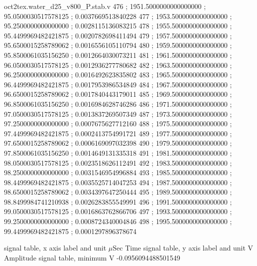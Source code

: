 \begin{filecontents}[overwrite]{oct2tex.water_d25_v800_P.stab.v}
476 ; 1951.5000000000000000 ; 95.0500030517578125 ; 0.0037669513840228
477 ; 1953.5000000000000000 ; 95.2500000000000000 ; 0.0028115136083215
478 ; 1955.5000000000000000 ; 95.4499969482421875 ; 0.0020782698411494
479 ; 1957.5000000000000000 ; 95.6500015258789062 ; 0.0016556105110794
480 ; 1959.5000000000000000 ; 95.8500061035156250 ; 0.0012664030073211
481 ; 1961.5000000000000000 ; 96.0500030517578125 ; 0.0012936277780682
482 ; 1963.5000000000000000 ; 96.2500000000000000 ; 0.0016492623835802
483 ; 1965.5000000000000000 ; 96.4499969482421875 ; 0.0017953986534849
484 ; 1967.5000000000000000 ; 96.6500015258789062 ; 0.0017840443179011
485 ; 1969.5000000000000000 ; 96.8500061035156250 ; 0.0016984628746286
486 ; 1971.5000000000000000 ; 97.0500030517578125 ; 0.0013837269507349
487 ; 1973.5000000000000000 ; 97.2500000000000000 ; 0.0007675627712160
488 ; 1975.5000000000000000 ; 97.4499969482421875 ; 0.0002413754991721
489 ; 1977.5000000000000000 ; 97.6500015258789062 ; 0.0006169097032398
490 ; 1979.5000000000000000 ; 97.8500061035156250 ; 0.0014649131335318
491 ; 1981.5000000000000000 ; 98.0500030517578125 ; 0.0023518626112491
492 ; 1983.5000000000000000 ; 98.2500000000000000 ; 0.0031546954996884
493 ; 1985.5000000000000000 ; 98.4499969482421875 ; 0.0035525714047253
494 ; 1987.5000000000000000 ; 98.6500015258789062 ; 0.0034397647250444
495 ; 1989.5000000000000000 ; 98.8499984741210938 ; 0.0026283855549991
496 ; 1991.5000000000000000 ; 99.0500030517578125 ; 0.0016863762866706
497 ; 1993.5000000000000000 ; 99.2500000000000000 ; 0.0008724340004846
498 ; 1995.5000000000000000 ; 99.4499969482421875 ; 0.0001297896378674
\end{filecontents}
\expandafter\def\csname oct2tex.water_d25_v800_P.stabxlbl.d\endcsname{signal table, x axis label and unit}
\expandafter\def\csname oct2tex.water_d25_v800_P.stabxlbl.u\endcsname{\ensuremath{\mu\text{Sec}}}
\expandafter\def\csname oct2tex.water_d25_v800_P.stabxlbl.v\endcsname{Time}
\expandafter\def\csname oct2tex.water_d25_v800_P.stabylbl.d\endcsname{signal table, y axis label and unit}
\expandafter\def\csname oct2tex.water_d25_v800_P.stabylbl.u\endcsname{\ensuremath{\text{V}}}
\expandafter\def\csname oct2tex.water_d25_v800_P.stabylbl.v\endcsname{Amplitude}
\expandafter\def\csname oct2tex.water_d25_v800_P.stabmin.d\endcsname{signal table, minimum}
\expandafter\def\csname oct2tex.water_d25_v800_P.stabmin.u\endcsname{\ensuremath{\text{V}}}
\expandafter\def\csname oct2tex.water_d25_v800_P.stabmin.v\endcsname{-0.0956094488501549}
